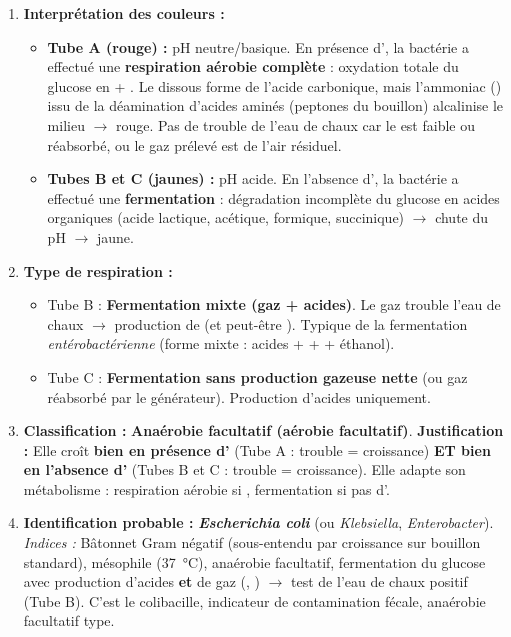 \documentclass[11pt]{article}
\begin{document}
\begin{exoresolu}
\begin{enumerate}
    \item \textbf{Interprétation des couleurs :}
        \begin{itemize}
            \item \textbf{Tube A (rouge) :} pH neutre/basique. En présence d', la bactérie a effectué une \textbf{respiration aérobie complète} : oxydation totale du glucose en  + . Le  dissous forme de l'acide carbonique, mais l'ammoniac () issu de la déamination d'acides aminés (peptones du bouillon) alcalinise le milieu $\rightarrow$ rouge. Pas de trouble de l'eau de chaux car le  est faible ou réabsorbé, ou le gaz prélevé est de l'air résiduel.
            \item \textbf{Tubes B et C (jaunes) :} pH acide. En l'absence d', la bactérie a effectué une \textbf{fermentation} : dégradation incomplète du glucose en acides organiques (acide lactique, acétique, formique, succinique) $\rightarrow$ chute du pH $\rightarrow$ jaune.
        \end{itemize}
    \item \textbf{Type de respiration :}
        \begin{itemize}
            \item Tube B : \textbf{Fermentation mixte (gaz + acides)}. Le gaz trouble l'eau de chaux $\rightarrow$ production de  (et peut-être ). Typique de la fermentation \emph{entérobactérienne} (forme mixte : acides +  +  + éthanol).
            \item Tube C : \textbf{Fermentation sans production gazeuse nette} (ou gaz réabsorbé par le générateur). Production d'acides uniquement.
        \end{itemize}
    \item \textbf{Classification :} \textbf{Anaérobie facultatif (aérobie facultatif)}.
        \textbf{Justification :} Elle croît \textbf{bien en présence d'} (Tube A : trouble = croissance) \textbf{ET bien en l'absence d'} (Tubes B et C : trouble = croissance). Elle adapte son métabolisme : respiration aérobie si , fermentation si pas d'.
    \item \textbf{Identification probable :} \textbf{\emph{Escherichia coli}} (ou \emph{Klebsiella}, \emph{Enterobacter}).
        \emph{Indices :} Bâtonnet Gram négatif (sous-entendu par croissance sur bouillon standard), mésophile (\SI{37}{\degreeCelsius}), anaérobie facultatif, fermentation du glucose avec production d'acides \textbf{et} de gaz (, ) $\rightarrow$ test de l'eau de chaux positif (Tube B). C'est le colibacille, indicateur de contamination fécale, anaérobie facultatif type.
\end{enumerate}
\end{exoresolu}
\end{document}

